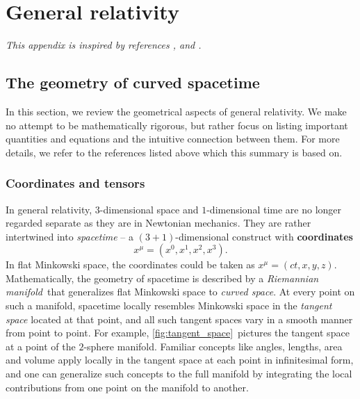 \appendix

\chapter{General relativity}

\textit{This appendix is inspired by references \cite{ref:carroll}, \cite{ref:mtw} and \cite{ref:mika_gr_notes}.}

\section{The geometry of curved spacetime}
\label{chap:gr_summary} %

\newcommand\pdvx[2]{\pdv{x^{#1}}{x^{#2}}}

In this section, we review the geometrical aspects of general relativity.
We make no attempt to be mathematically rigorous, but rather focus on listing important quantities and equations and the intuitive connection between them.
For more details, we refer to the references listed above which this summary is based on.

\subsection{Coordinates and tensors}

In general relativity, $3$-dimensional space and $1$-dimensional time are no longer regarded separate as they are in Newtonian mechanics.
They are rather intertwined into \emph{spacetime} -- a $(3+1)$-dimensional construct with \textbf{coordinates}
\begin{equation}
	x^\mu = (x^0, x^1, x^2, x^3) .
\end{equation}
In flat Minkowski space, the coordinates could be taken as $x^\mu = (ct, x, y, z)$.
Mathematically, the geometry of spacetime is described by a \emph{Riemannian manifold} that generalizes flat Minkowski space to \emph{curved space}.
At every point on such a manifold, spacetime locally resembles Minkowski space in the \emph{tangent space} located at that point, and all such tangent spaces vary in a smooth manner from point to point.
For example, \cref{fig:tangent_space} pictures the tangent space at a point of the $2$-sphere manifold.
Familiar concepts like angles, lengths, area and volume apply locally in the tangent space at each point in infinitesimal form, and one can generalize such concepts to the full manifold by integrating the local contributions from one point on the manifold to another.

